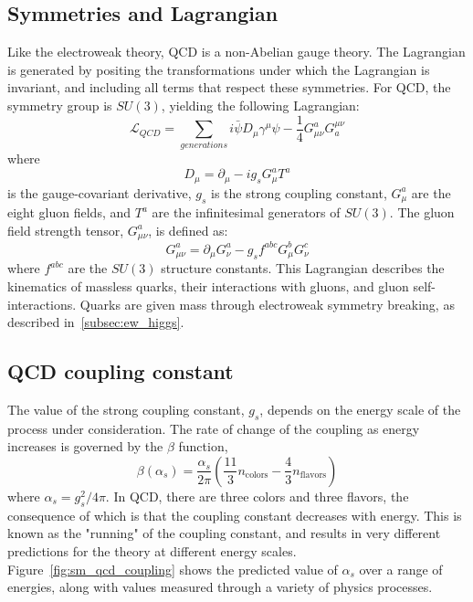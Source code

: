 \subsection{Symmetries and Lagrangian}\label{subsec:qcd_lagrangian}
Like the electroweak theory, QCD is a non-Abelian gauge theory.
The Lagrangian is generated by positing the transformations under which the Lagrangian is invariant,
and including all terms that respect these symmetries.
For QCD, the symmetry group is $SU(3)$, yielding the following Lagrangian:
\begin{equation}\label{eq:qcd-lagrangian}
    \mathcal{L}_{QCD} = \sum_{generations}i\bar{\psi}D_\mu\gamma^\mu\psi-\frac{1}{4}G_{\mu\nu}^a G_a^{\mu\nu}
\end{equation}
where
\begin{equation}\label{eq:qcd-derivative}
D_\mu = \partial_\mu - i g_s G_\mu^a T^a
\end{equation}
is the gauge-covariant derivative, $g_s$ is the strong coupling constant, $G_\mu^a$ are the eight gluon fields,
and $T^a$ are the infinitesimal generators of $SU(3)$.
The gluon field strength tensor, $G_{\mu\nu}^a$, is defined as:
\begin{equation}\label{eq:qcd-field-strength}
    G_{\mu\nu}^a = \partial_\mu G_\nu^a - g_s f^{abc} G_\mu^b G_\nu ^c
\end{equation}
where $f^{abc}$ are the $SU(3)$ structure constants.
This Lagrangian describes the kinematics of massless quarks, their interactions with gluons, and gluon self-interactions.
Quarks are given mass through electroweak symmetry breaking, as described in~\ref{subsec:ew_higgs}.

\subsection{QCD coupling constant}\label{subsec:qcd_coupling}
The value of the strong coupling constant, $g_s$, depends on the energy scale of the process under consideration.
The rate of change of the coupling as energy increases is governed by the $\beta$ function,
\begin{equation}\label{eq:sm-qcd-beta}
    \beta\left(\alpha_s\right) = \frac{\alpha_s}{2\pi}\left(\frac{11}{3}n_{\text{colors}}-\frac{4}{3}n_{\text{flavors}}\right)
\end{equation}
where $\alpha_s = g_s^2 / 4\pi$.
In QCD, there are three colors and three flavors, the consequence of which is that the coupling constant decreases with energy.
This is known as the "running" of the coupling constant, and results in very different predictions for the theory at different energy scales.
Figure~\ref{fig:sm_qcd_coupling} shows the predicted value of $\alpha_s$ over a range of energies, along with values measured through a variety of physics processes.

